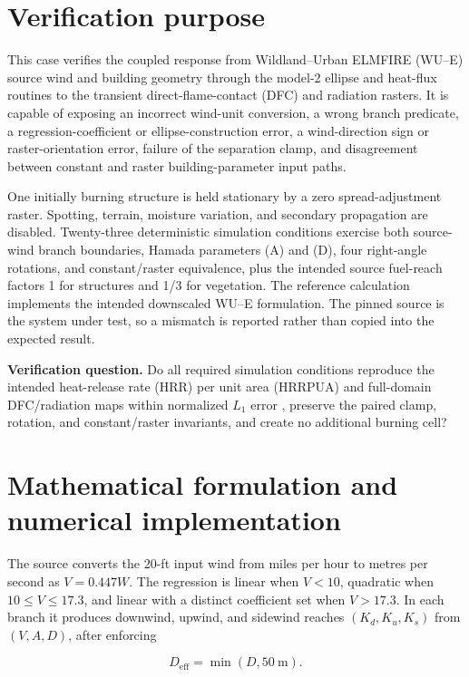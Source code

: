 \section{Verification purpose}

This case verifies the coupled response from Wildland--Urban ELMFIRE (WU--E) source wind and building
geometry through the model-2 ellipse and heat-flux routines to the
transient direct-flame-contact (DFC) and radiation rasters.  It is capable of
exposing an incorrect wind-unit conversion, a wrong branch predicate, a
regression-coefficient or ellipse-construction error, a wind-direction sign or
raster-orientation error, failure of the separation clamp, and disagreement
between constant and raster building-parameter input paths.

One initially burning structure is held stationary by a zero spread-adjustment
raster.  Spotting, terrain, moisture variation, and secondary propagation are
disabled. Twenty-three deterministic simulation conditions exercise both source-wind branch
boundaries, Hamada parameters (A) and (D), four right-angle rotations, and
constant/raster equivalence, plus the intended source fuel-reach factors 1 for
structures and 1/3 for vegetation. The reference calculation implements the intended downscaled
WU--E formulation.  The pinned source is the system under test, so a mismatch
is reported rather than copied into the expected result.

\textbf{Verification question.} Do all required simulation conditions reproduce the
intended heat-release rate (HRR) per unit area (HRRPUA) and full-domain DFC/radiation maps within normalized
$L_1$ error \HeatMapTolerance, preserve the paired clamp, rotation, and
constant/raster invariants, and create no additional burning cell?

\ReportOverview

\section{Mathematical formulation and numerical implementation}

The source converts the 20-ft input wind from miles per hour to metres per
second as $V=0.447W$.  The regression is linear when $V<10$, quadratic when
$10\le V\le17.3$, and linear with a distinct coefficient set when
$V>17.3$.  In each branch it produces downwind, upwind, and sidewind reaches
$(K_d,K_u,K_s)$ from $(V,A,D)$, after enforcing

\begin{equation}
  D_{\mathrm{eff}}=\min(D,\SI{50}{\metre}).
\end{equation}

